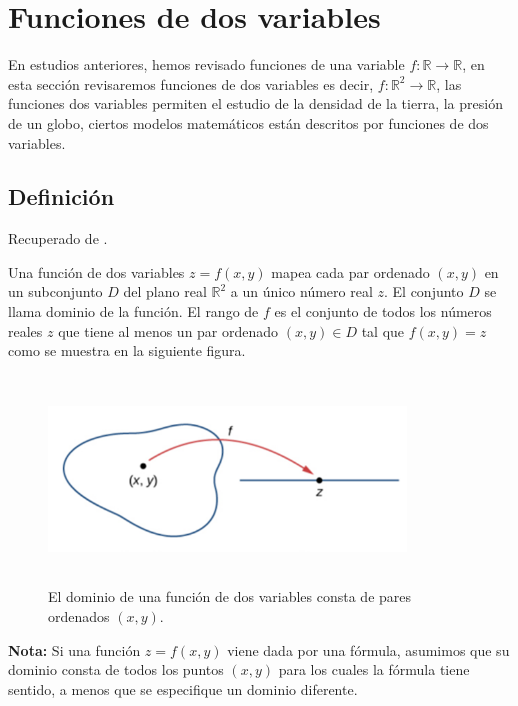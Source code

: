 \chapter{Funciones de dos variables}
En estudios anteriores, hemos revisado funciones de una variable $f: \mathbb{R} \rightarrow \mathbb{R}$,
en esta sección revisaremos funciones de dos variables es decir, $f: \mathbb{R}^{2} \rightarrow \mathbb{R}$,
las funciones dos variables permiten el estudio de la densidad de la tierra, la presión de un globo, ciertos modelos matemáticos están descritos por funciones de dos variables.\par
\section{Definición}
Recuperado de \cite{strang}.\par
Una función de dos variables $z=f(x, y)$ mapea cada par ordenado $(x, y)$ en un subconjunto $D$ del plano real $\mathbb{R}^{2}$ a un único número real $z$. El conjunto $D$ se llama dominio de la función. El rango de $f$ es el conjunto de todos los números reales $z$ que tiene al menos un par ordenado $(x, y) \in D$ tal que $f(x, y)=z$ como se muestra en la siguiente figura.\par
\begin{figure}[H]
    \centering
    \includegraphics[width=9.5cm, height=5.5cm]{imagenes/NImagen1.png}
    \caption{El dominio de una función de dos variables consta de pares ordenados $(x, y)$.}
\end{figure}
\textbf{Nota:} Si una función $z=f(x, y)$ viene dada por una fórmula, asumimos que su dominio consta de todos los puntos $(x, y)$ para los cuales la fórmula tiene sentido, a menos que se especifique un dominio diferente.\par
